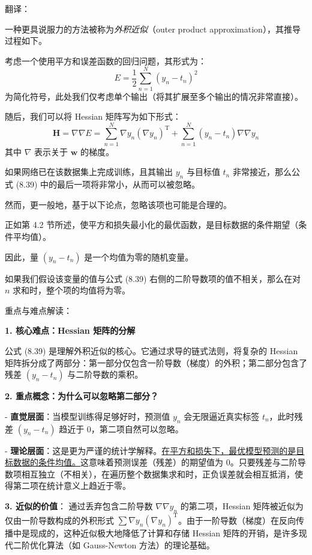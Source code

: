 \documentclass{article}
\begin{document}
{\color{red}
翻译：

一种更具说服力的方法被称为\textit{外积近似}（outer product approximation），其推导过程如下。

考虑一个使用平方和误差函数的回归问题，其形式为：
\begin{equation}
    E = \frac{1}{2} \sum_{n=1}^N (y_n - t_n)^2
    \tag{8.38}
\end{equation}
为简化符号，此处我们仅考虑单个输出（将其扩展至多个输出的情况非常直接）。

随后，我们可以将 Hessian 矩阵写为如下形式：
\begin{equation}
    \mathbf{H} = \nabla \nabla E = \sum_{n=1}^N \nabla y_n (\nabla y_n)^\mathrm{T} + \sum_{n=1}^N (y_n - t_n) \nabla \nabla y_n
    \tag{8.39}
\end{equation}
其中 $\nabla$ 表示关于 $\mathbf{w}$ 的梯度。

如果网络已在该数据集上完成训练，且其输出 $y_n$ 与目标值 $t_n$ 非常接近，那么公式 (8.39) 中的最后一项将非常小，从而可以被忽略。

然而，更一般地，基于以下论点，忽略该项也可能是合理的。

正如第 4.2 节所述，使平方和损失最小化的最优函数，是目标数据的条件期望（条件平均值）。

因此，量 $(y_n - t_n)$ 是一个均值为零的随机变量。

如果我们假设该变量的值与公式 (8.39) 右侧的二阶导数项的值不相关，那么在对 $n$ 求和时，整个项的均值将为零。
}

{\color{blue}
重点与难点解读：

\textbf{1. 核心难点：Hessian 矩阵的分解}

公式 (8.39) 是理解外积近似的核心。它通过求导的链式法则，将复杂的 Hessian 矩阵拆分成了两部分：第一部分仅包含一阶导数（梯度）的外积；第二部分包含了残差 $(y_n - t_n)$ 与二阶导数的乘积。

\textbf{2. 重点概念：为什么可以忽略第二部分？}

- \textbf{直觉层面}：当模型训练得足够好时，预测值 $y_n$ 会无限逼近真实标签 $t_n$，此时残差 $(y_n - t_n)$ 趋近于 0，第二项自然可以忽略。

- \textbf{理论层面}：这是更为严谨的统计学解释。\underline{在平方和损失下，最优模型预测的是目标数据的条件均值。}这意味着预测误差（残差）的期望值为 0。只要残差与二阶导数项相互独立（不相关），在遍历整个数据集求和时，正负误差就会相互抵消，使得第二项在统计意义上趋近于零。

\textbf{3. 近似的价值}：
通过丢弃包含二阶导数 $\nabla \nabla y_n$ 的第二项，Hessian 矩阵被近似为仅由一阶导数构成的外积形式 $\sum \nabla y_n (\nabla y_n)^\mathrm{T}$。由于一阶导数（梯度）在反向传播中是现成的，这种近似极大地降低了计算和存储 Hessian 矩阵的开销，是许多现代二阶优化算法（如 Gauss-Newton 方法）的理论基础。


}
\end{document}
